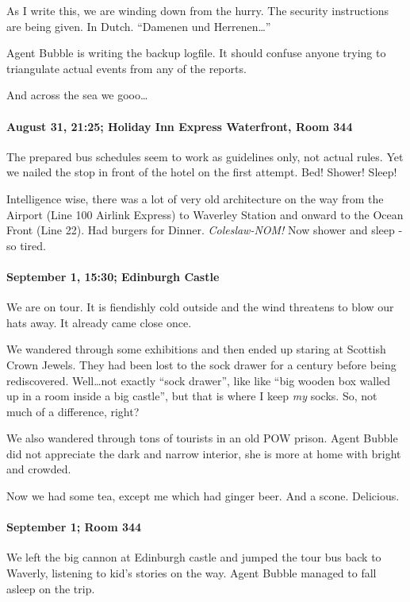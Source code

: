 As I write this, we are winding down from the hurry.
The security instructions are being given.
In Dutch.
"`Damenen und Herrenen\ldots{}"'

Agent Bubble is writing the backup logfile.
It should confuse anyone trying to triangulate actual events from any of the reports.

And across the sea we gooo\ldots

\paragraph{August 31, 21:25; Holiday Inn Express Waterfront, Room 344}
The prepared bus schedules seem to work as guidelines only, not actual rules.
Yet we nailed the stop in front of the hotel on the first attempt.
Bed!
Shower!
Sleep!

Intelligence wise, there was a lot of very old architecture on the way from the Airport (Line 100 Airlink Express) to Waverley Station and onward to the Ocean Front (Line 22).
Had burgers for Dinner.
\emph{Coleslaw-NOM!}
Now shower and sleep - so tired.

\paragraph{September 1, 15:30; Edinburgh Castle}
We are on tour.
It is fiendishly cold outside and the wind threatens to blow our hats away.
It already came close once.

We wandered through some exhibitions and then ended up staring at Scottish Crown Jewels.
They had been lost to the sock drawer for a century before being rediscovered.
Well\ldots not exactly "`sock drawer"', like like "`big wooden box walled up in a room inside a big castle"', but that is where I keep \emph{my} socks.
So, not much of a difference, right?

We also wandered through tons of tourists in an old POW prison.
Agent Bubble did not appreciate the dark and narrow interior, she is more at home with bright and crowded.

Now we had some tea, except me which had ginger beer.
And a scone.
Delicious.

\paragraph{September 1; Room 344}
We left the big cannon at Edinburgh castle and jumped the tour bus back to Waverly, listening to kid's stories on the way.
Agent Bubble managed to fall asleep on the trip.

